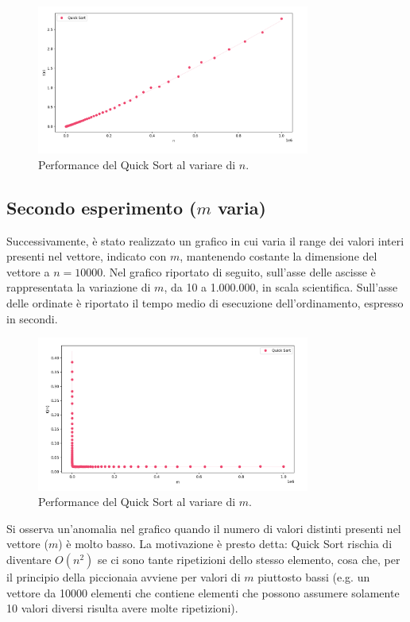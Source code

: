 \documentclass[a4paper, 12pt, oneside]{book}
\begin{document}
\begin{figure}[H]
    \centering
    \includegraphics[width=0.8\textwidth]{images/grafico_quick_sort_n.png}
    \caption{Performance del Quick Sort al variare di \(n\).}
    \label{fig:quick_sort_n}
\end{figure}

\subsection{Secondo esperimento ($m$ varia)}

\noindent Successivamente, è stato realizzato un grafico in cui varia il range dei valori interi presenti nel vettore, indicato con \(m\), mantenendo costante la dimensione del vettore a \(n=10000\). Nel grafico riportato di seguito, sull'asse delle ascisse è rappresentata la variazione di \(m\), da 10 a 1.000.000, in scala scientifica. Sull'asse delle ordinate è riportato il tempo medio di esecuzione dell'ordinamento, espresso in secondi.

\begin{figure}[H]
    \centering
    \includegraphics[width=0.8\textwidth]{images/grafico_quick_sort_m.png}
    \caption{Performance del Quick Sort al variare di \(m\).}
    \label{fig:quick_sort_m}
\end{figure}

\noindent Si osserva un'anomalia nel grafico quando il numero di valori distinti presenti nel vettore (\(m\)) è molto basso. La motivazione è presto detta: Quick Sort rischia di diventare $O(n^2)$ se ci sono tante ripetizioni dello stesso elemento, cosa che, per il principio della piccionaia avviene per valori di $m$ piuttosto bassi (e.g. un vettore da 10000 elementi che contiene elementi che possono assumere solamente 10 valori diversi risulta avere molte ripetizioni).
\end{document}
